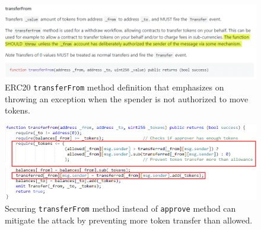 \begin{figure}[t]
	\centering
	\includegraphics[width=1.0\linewidth]{figures/multiple_withdrawal_30.png}
	\caption{ERC20 \texttt{transferFrom} method definition that emphasizes on throwing an exception when the spender is not authorized to move tokens.\label{fig:standard}}
\end{figure}

\begin{figure}[t]
	\centering
	\includegraphics[width=1.0\linewidth]{figures/multiple_withdrawal_31.png}
	\caption{Securing \texttt{transferFrom} method instead of \texttt{approve} method can mitigate the attack by preventing more token transfer than allowed.\label{fig:transfer2}}
\end{figure}